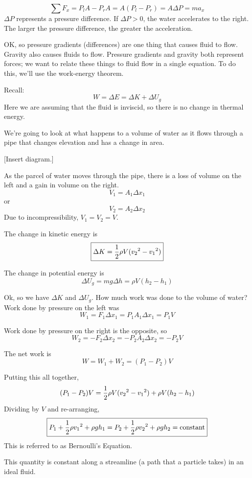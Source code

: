 $$\sum F_x=P_lA-P_rA=A(P_l-P_r)=A\Delta{P}=ma_x$$
$\Delta{P}$ represents a pressure difference. If $\Delta{P}>0$, the water accelerates to the right. The larger the pressure difference, the greater the acceleration. %


OK, so pressure gradients (differences) are one thing that causes fluid to flow. Gravity also causes fluids to flow. Pressure gradients and gravity both represent forces; we want to relate these things to fluid flow in a single equation. To do this, we'll use the work-energy theorem.

Recall:
$$W=\Delta E=\Delta K+\Delta U_g$$
Here we are assuming that the fluid is inviscid, so there is no change in thermal energy.

We're going to look at what happens to a volume of water as it flows through a pipe that changes elevation and has a change in area.

[Insert diagram.]
\vspace{5cm}

As the parcel of water moves through the pipe, there is a loss of volume on the left and a gain in volume on the right. 
$$V_1=A_1\Delta{x_1}$$
or
$$V_2=A_2\Delta{x_2}$$
Due to incompressibility, $V_1=V_2=V$. 

The change in kinetic energy is
$$\boxed{\Delta K=\frac{1}{2}\rho V(v_2\displaystyle^2-v_1\displaystyle^2)}$$

The change in potential energy is
$$\boxed{\Delta U_g=mg\Delta h=\rho V(h_2-h_1)}$$

Ok, so we have $\Delta{K}$ and $\Delta{U_g}$. How much work was done to the volume of water? Work done by pressure on the left was
$$W_1=F_1\Delta x_1=P_1A_1\Delta x_1=P_1 V$$

Work done by pressure on the right is the opposite, so
$$W_2=-F_2\Delta x_2=-P_2A_2\Delta x_2=-P_2 V$$

The net work is 
$$\boxed{W=W_1+W_2=(P_1-P_2)V}$$

Putting this all together,
$$(P_1-P_2)V=\frac{1}{2}\rho V(v_2\displaystyle^2-v_1\displaystyle^2)+\rho V(h_2-h_1)$$
Dividing by $V$ and re-arranging,
$$\boxed{P_1+\frac{1}{2}\rho v_1\displaystyle^2+\rho gh_1=P_2+\frac{1}{2}\rho v_2\displaystyle^2+\rho gh_2=\mbox{constant}}$$
This is referred to as Bernoulli's Equation.

This quantity is constant along a streamline (a path that a particle takes) in an ideal fluid.

